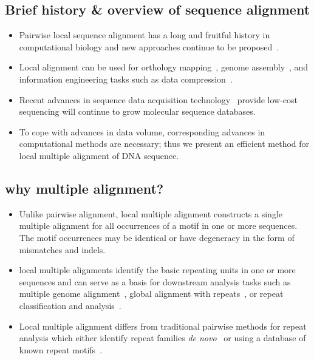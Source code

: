 \documentclass{llncs}
\begin{document}
\subsection{Brief history \& overview of sequence alignment}
\begin{itemize}

\item Pairwise local sequence alignment has a long and fruitful history
in computational biology and new approaches continue to be
proposed~\cite{ref-pattern,ref-chaos,ref-yass,ref-kahveciMAP}.

\item Local alignment can be used for orthology
mapping~\cite{ref-orthomcl}, genome assembly~\cite{ref-arachne2},
and information engineering tasks such as data
compression~\cite{ref-ane}. 

\item Recent advances in sequence data
acquisition technology~\cite{ref-454} provide low-cost sequencing
will continue to grow molecular sequence
databases. 

\item To cope with advances in data volume, corresponding
advances in computational methods are necessary; thus we present
an efficient method for local multiple alignment of DNA sequence.

\end{itemize}

\subsection{why multiple alignment?}
\begin{itemize}

\item Unlike pairwise alignment, local multiple alignment constructs a
single multiple alignment for all occurrences of a motif in one or
more sequences.  The motif occurrences may be identical or have
degeneracy in the form of mismatches and indels.  

\item local multiple alignments identify the basic repeating units in one or
more sequences and can serve as a basis for downstream analysis
tasks such as multiple genome
alignment~\cite{ref-mauve,ref-mga,ref-mgcat,ref-deweyReview}, global
alignment with repeats~\cite{ref-otherSammethPaper,ref-aba}, or
repeat classification and analysis~\cite{ref-piler}. 

\item Local multiple
alignment differs from traditional pairwise methods for repeat
analysis which either identify repeat families \textit{de
novo}~\cite{ref-reputer} or using a database of known repeat
motifs~\cite{ref-repbase}.

\end{itemize}
\end{document}
